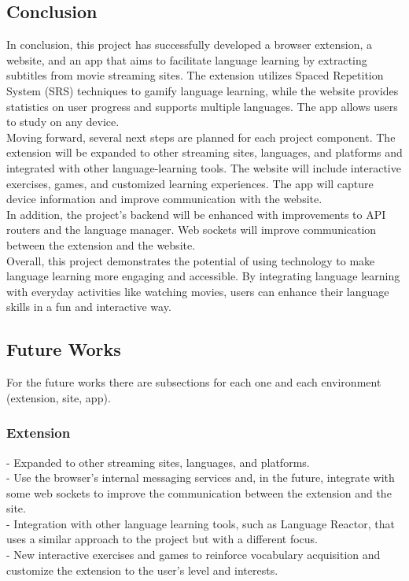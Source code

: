 \documentclass[12pt]{article}
\begin{document}
\subsection{Conclusion}
In conclusion, this project has successfully developed a browser extension, a website, and an app that aims to facilitate language learning by extracting subtitles from movie streaming sites. The extension utilizes Spaced Repetition System (SRS) techniques to gamify language learning, while the website provides statistics on user progress and supports multiple languages. The app allows users to study on any device. \\
Moving forward, several next steps are planned for each project component. The extension will be expanded to other streaming sites, languages, and platforms and integrated with other language-learning tools. The website will include interactive exercises, games, and customized learning experiences. The app will capture device information and improve communication with the website. \\
In addition, the project's backend will be enhanced with improvements to API routers and the language manager. Web sockets will improve communication between the extension and the website. \\
Overall, this project demonstrates the potential of using technology to make language learning more engaging and accessible. By integrating language learning with everyday activities like watching movies, users can enhance their language skills in a fun and interactive way.

\subsection{Future Works}

For the future works there are subsections for each one and each environment (extension, site, app).

\subsubsection{Extension}
- Expanded to other streaming sites, languages, and platforms.  \\
- Use the browser's internal messaging services and, in the future, integrate with some web sockets to improve the communication between the extension and the site.  \\
- Integration with other language learning tools, such as Language Reactor, that uses a similar approach to the project but with a different focus.  \\
- New interactive exercises and games to reinforce vocabulary acquisition and customize the extension to the user's level and interests.
\end{document}
